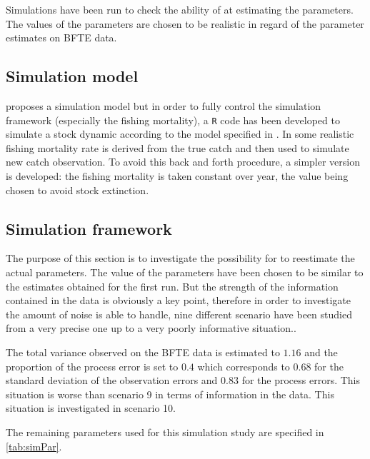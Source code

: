 Simulations have been run to check the ability of \iscam at estimating
the parameters. The values of the parameters are chosen to be realistic in regard of the parameter estimates on BFTE data.

\subsection{Simulation model}
\iscam proposes a simulation model but in order to fully control the simulation framework (especially the fishing mortality), a \verb+R+ code has been developed to simulate a stock dynamic according to the model specified in \iscam.
In \iscam some realistic fishing mortality rate is derived from the true catch and then used to simulate new catch observation. 
To avoid this back and forth procedure, a simpler version is developed: 
the fishing mortality is taken constant over year, the value being chosen to avoid stock extinction.


\subsection{Simulation framework}
The purpose of this section is to investigate the possibility for \iscam to reestimate the actual parameters. The value of the parameters have been chosen to be similar to the estimates obtained for the first run.
But the strength of the information contained in the data is obviously a key point, therefore in order to investigate the amount of noise \iscam is able to handle, nine different scenario have been studied from a very precise one up to a very poorly informative situation..

The total variance observed on the BFTE data is estimated to $1.16$ and the proportion of the process error is set to $0.4$ which corresponds to $0.68$ for the standard deviation of the observation errors and $0.83$ for the process errors. 
This situation is worse than scenario 9 in terms of information in the data. This situation is investigated in scenario 10.

The remaining parameters used for this simulation study  are specified in \ref{tab:simPar}.		

